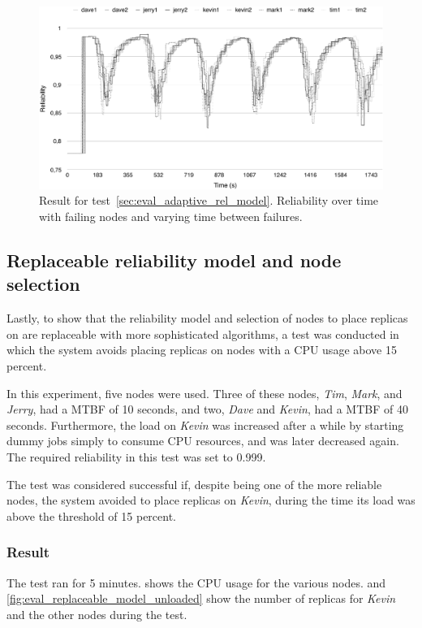 \documentclass{cslthse-msc}
\begin{document}
\begin{figure}[!hbt]
\centering
\includegraphics[scale=0.5]{images/results/self_adaptive_node_rels.pdf}
\caption{Result for test~\ref{sec:eval_adaptive_rel_model}. Reliability over time with failing nodes and varying time between failures.} \label{fig:eval_self_adaptive_node_rels}
\end{figure}

\subsection{Replaceable reliability model and node selection} \label{sec:eval_replaceable_model}
Lastly, to show that the reliability model and selection of nodes to place replicas on are replaceable with more sophisticated algorithms, a test was conducted in which the system avoids placing replicas on nodes with a CPU usage above 15 percent. 

In this experiment, five nodes were used. Three of these nodes, \emph{Tim}, \emph{Mark}, and \emph{Jerry}, had a MTBF of 10 seconds, and two, \emph{Dave} and \emph{Kevin}, had a MTBF of 40 seconds. Furthermore, the load on \emph{Kevin} was increased after a while by starting dummy jobs simply to consume CPU resources, and was later decreased again. The required reliability in this test was set to 0.999.

The test was considered successful if, despite being one of the more reliable nodes, the system avoided to place replicas on \emph{Kevin}, during the time its load was above the threshold of 15 percent.

\subsubsection*{Result}
The test ran for 5 minutes.  shows the CPU usage for the various nodes.  and \cref{fig:eval_replaceable_model_unloaded} show the number of replicas for \emph{Kevin} and the other nodes during the test.
\end{document}
